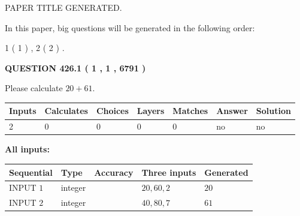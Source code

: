 \documentclass[12pt]{article}
\begin{document}
   
\vspace{0.2in}
   
   
   
   
   
   
   
   
 \vspace{0.2in}
 
 
 
 
   
   
 PAPER TITLE GENERATED.
   
   
   
\vspace{0.2in}
   
In this paper, big questions will be generated in the following order: 
   
   
   1 ( 1 )
 ,
   2 ( 2 )
 .
  
\vspace{0.2in}
  
{\textbf{\Large{QUESTION
426.1 
 ( 1 , 1 , 6791 )
}}}
  
  
 
Please calculate $ %
20 +  %
61 $.
 
 
   
   
   
   
\noindent\begin{tabular}{|l|l|l|l|l|l|l|}
 \hline
Inputs & Calculates & Choices & Layers & Matches & Answer & Solution \\ \hline
 2  & 
 0  & 
 0
  & 
 0  & 
 0  & 
  no & 
  no 
  \\ \hline
 \end{tabular}
   
   
   
   
\noindent{}
   
   
   
   
\noindent\vspace{0.1in}\hspace{-0.08in} {\textbf{\Large{All inputs: }}}
   
   
  
  
\noindent\begin{tabular}{|l|l|l|l|l|}
\hline
 Sequential & Type & Accuracy & Three inputs & Generated \\ 
\hline
 
 
  INPUT $  1 $ & integer &  & $
 20
 , 
 60
 , 
 2
 $ & $ 20 $ 
 \\  \hline  
 
 
  INPUT $  2 $ & integer &  & $
 40
 , 
 80
 , 
 7
 $ & $ 61 $ 
 \\  \hline  
 \end{tabular}
   
\end{document}
